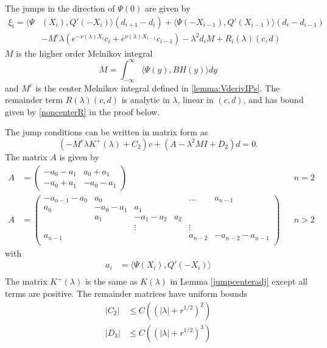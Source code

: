 \documentclass[thesis.tex]{subfiles}
\begin{document}
\begin{lemma}\label{jumpadj}
The jumps in the direction of $\Psi(0)$ are given by
\begin{equation}\label{jumpPsi0}
\begin{aligned}
\xi_i = \langle \Psi&(X_i), Q'(-X_i) \rangle (d_{i+1} - d_i ) + \langle \Psi(-X_{i-1}), Q'(X_{i-1}) \rangle (d_i - d_{i-1} ) \\
&- M^c \lambda( e^{-\nu(\lambda)X_i}c_i + e^{\nu(\lambda)X_{i-1}}c_{i-1})
- \lambda^2 d_i M + R_i(\lambda)(c, d)
\end{aligned}
\end{equation}
$M$ is the higher order Melnikov integral
\begin{equation}\label{defM2}
M = \int_{-\infty}^\infty \langle \Psi(y), B H(y) \rangle dy
\end{equation}
and $M^c$ is the center Melnikov integral defined in \cref{lemma:VderivIPs}. The remainder term $R(\lambda)(c, d)$ is analytic in $\lambda$, linear in $(c, d)$, and has bound given by \cref{noncenterR} in the proof below. 

The jump conditions can be written in matrix form as
\begin{equation}
(- M^c \lambda K^+(\lambda) + C_2 )c + (A - \lambda^2 M I + D_2)d = 0.
\end{equation}
The matrix $A$ is given by
\begin{align*}
A &= \begin{pmatrix}
-a_0 -a_1 & a_0 + a_1 \\
-a_0 + a_1 & -a_0 - a_1
\end{pmatrix} && n = 2 \\
A &= \begin{pmatrix}
-a_{n-1} - a_0 & a_0 & & & \dots & a_{n-1}\\
a_0 & -a_0 - a_1 &  a_1 \\
& a_1 & -a_1 - a_2 &  a_2 \\
& & \vdots & & \vdots \\
a_{n-1} & & & & a_{n-2} & -a_{n-2} - a_{n-1} \\
\end{pmatrix} && n > 2
\end{align*}
with
\begin{align*}
a_i &= \langle \Psi(X_i), Q'(-X_i) \rangle \\
\end{align*}
The matrix $K^+(\lambda)$ is the same as $K(\lambda)$ in Lemma \ref{jumpcenteradj} except all terms are positive. The remainder matrices have uniform bounds
\begin{align}\label{adjjumprem}
|C_2| &\leq C\left((|\lambda| + r^{1/2})^2 \right) \\
|D_3| &\leq C\left((|\lambda| + r^{1/2})^3 \right)
\end{align}


\end{lemma}
\end{document}
